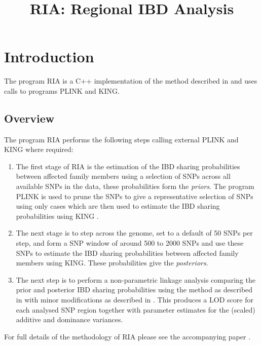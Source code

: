 \documentclass[a4paper,12pt]{article}
\begin{document}
\title{RIA: Regional IBD Analysis}
\date{}
\author{}
\maketitle
\newpage
\tableofcontents
\newpage
\section{Introduction}
\label{introduction}

The program RIA is a C++ implementation of the method described in \citet{nat:15} and uses calls to programs PLINK and KING.
\subsection{Overview}
\label{overview}

The program RIA performs the following steps calling external PLINK and KING where required: 
\begin{enumerate}

\item The first stage of RIA is the estimation of the IBD sharing probabilities between affected family members using a selection of SNPs across all available SNPs in the data, these probabilities form the {\it priors}. The program PLINK \citet{purcell:etal:07} is used to prune the SNPs to give a representative selection of SNPs using only cases which are then used to estimate the IBD sharing probabilities using KING \citet{manichaikul:etal:10}. 
\item The next stage is to step across the genome, set to a default of 50 SNPs per step, and form a SNP window of around 500 to 2000 SNPs and use these SNPs to estimate the IBD sharing probabilities between affected family members using KING. These probabilities give the {\it posteriors}. 
\item The next step is to perform a non-parametric linkage analysis comparing the prior and posterior IBD sharing probabilities using the method as described in \citet{cordell:etal:00} with minor modifications as described in \citet{nat:15}. This produces a LOD score for each analysed SNP region together with parameter estimates for the (scaled) additive and dominance variances.\end{enumerate}

For full details of the methodology of RIA please see the accompanying paper \citet{nat:15}. 

\end{document}

